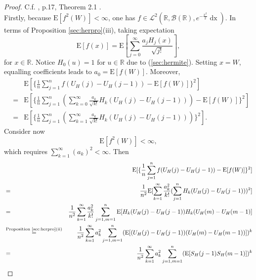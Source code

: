 \documentclass[a4paper, twoside, 11pt]{article}
\theoremstyle{definition}
\begin{document}
  \begin{proof}
	C.f. \cite{nourdin}, p.17, Theorem 2.1 .\\
	Firstly, because $\mathrm{E}[f^2(W)] < \infty$, one has $f \in \mathcal{L}^2(\mathbb{R}, \mathscr{B}(\mathbb{R}), e^{-\frac{x^2}{2}}\mathop{dx})$. In terms of Proposition \ref{sec:herpro}(iii), taking expectation
   \begin{equation*}
	  \mathrm{E}[f(x)] = \mathrm{E}[\sum\limits_{j=0}^{\infty} \frac{a_jH_j(x)}{\sqrt{j!}}], 
	\end{equation*}
	for $x \in \mathbb{R}$.
	Notice $H_0(u)=1$ for $u\in \mathbb{R}$ due to (\ref{sec:hermite}). Setting $x=W$, equalling coefficients leads to $a_0 = \mathrm{E}[f(W)]$. Moreover,
	\begin{eqnarray*}
	  && \mathrm{E}[\{\frac{1}{n}\sum\limits_{j=1}^n f(U_H(j) - U_H(j-1)) - \mathrm{E}[f(W)]\}^2]\\
	  &=& \mathrm{E}[\{\frac{1}{n}\sum\limits_{j=1}^n (\sum\limits_{k=0}^\infty \frac{a_k}{\sqrt{k!}} H_k(U_H(j) - U_H(j-1))) - \mathrm{E}[f(W)]\}^2] \\
	  &=& \mathrm{E}[\{\frac{1}{n}\sum\limits_{j=1}^n (\sum\limits_{k=1}^\infty \frac{a_k}{\sqrt{k!}} H_k(U_H(j) - U_H(j-1)))\}^2].
	\end{eqnarray*}
	Consider now 
	\begin{equation*}
	  \mathrm{E}[f^2(W)] < \infty,
	\end{equation*}
	which requires $\sum\limits_{k=1}^\infty (a_k)^2 < \infty$. Then
	\begin{eqnarray*}
	  && \mathrm{E}[\{\frac{1}{n}\sum\limits_{j=1}^n f(U_H(j) - U_H(j-1)) - \mathrm{E}[f(W)]\}^2]\\
	  &=& \frac{1}{n^2} \mathrm{E}[\sum\limits_{k=1}^\infty \frac{a_k^2}{k!}(\sum\limits_{j=1}^n H_k(U_H(j) - U_H(j-1)))^2] \\
	  &=& \frac{1}{n^2} \sum\limits_{k=1}^\infty \frac{a_k^2}{k!}\sum\limits_{j=1, m=1}^n \mathrm{E}[H_k(U_H(j) - U_H(j-1))  H_k(U_H(m) - U_H(m-1)]\\
	  &\overset{\text{Proposition \ref{sec:herpro}(ii)}}{=}&  \frac{1}{n^2} \sum\limits_{k=1}^\infty a_k^2\sum\limits_{j=1, m=1}^n (\mathrm{E}[(U_H(j) - U_H(j-1)) (U_H(m) - U_H(m-1))])^k \\
	  &=& \frac{1}{n^2} \sum\limits_{k=1}^\infty a_k^2\sum\limits_{j=1, m=1}^n (\mathrm{E}[S_H(j-1) S_H(m-1)])^k\\

\end{eqnarray*}
\end{proof}
\end{document}
